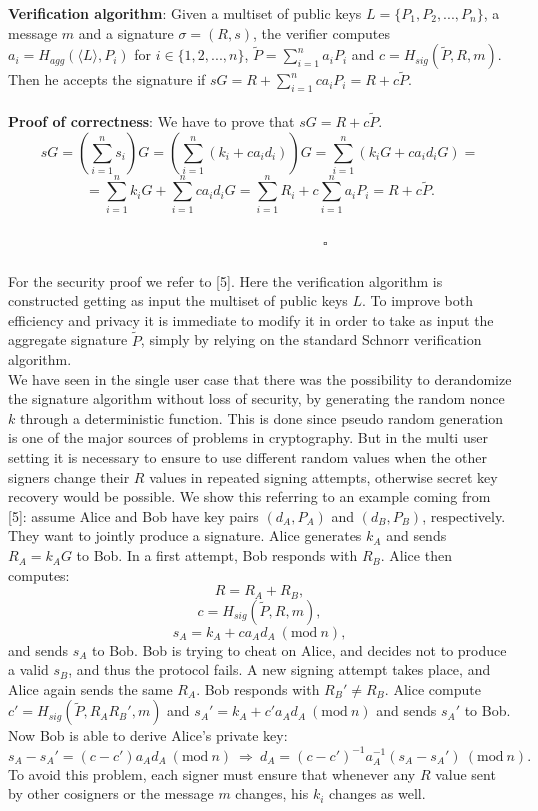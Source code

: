 \bigskip
\noindent
{\bf Verification algorithm}: Given a multiset of public keys $L = \{P_1, P_2, ..., P_n\}$, a message $m$ and a signature $\sigma = (R, s)$, the verifier computes $a_i = H_{agg}(\langle L \rangle, P_i)$ for $i \in \{1, 2, ..., n\}$, $\tilde{P} = \sum_{i = 1}^{n} a_iP_i$ and $c = H_{sig}(\tilde{P}, R, m)$. Then he accepts the signature if $sG = R + \sum_{i = 1}^{n}ca_iP_i = R + c\tilde{P}$. 
\\
\\
{\bf Proof of correctness}: We have to prove that $sG = R + c\tilde{P}$.
\\
$$sG = \left(\sum_{i = 1}^{n} s_i\right)G = \left(\sum_{i = 1}^{n}(k_i + ca_id_i)\right)G = \sum_{i = 1}^{n}(k_iG + ca_id_iG) =$$
$$= \sum_{i = 1}^{n}k_iG + \sum_{i = 1}^{n} ca_id_iG = \sum_{i = 1}^{n}R_i + c\sum_{i  = 1}^{n}a_iP_i = R + c\tilde{P}.$$
\ \ \ \ \ \ \ \ \ \ \ \ \ \ \ \ \ \ \ \ \ \ \ \ \ \ \ \ \ \ \ \ \ \ \ \ \ \ \ \ \ \ \ \ \ \ \ \ \ \ \ \ \ \ \ \ \ \ \ \ \ \ \ \ \ \ \ \ \ \ \ \ \ \ \ \ \ \ \ \ \ \ \ \ \ \ \ \ \ \ \ \ \ \ \ \ \ \ \ \ \ \ \ \ \ \ \ \ \ \ \ \ \ \ \ \ \ $\square$
\\
\\
For the security proof we refer to [5]. Here the verification algorithm is constructed getting as input the multiset of public keys $L$. To improve both efficiency and privacy it is immediate to modify it in order to take as input the aggregate signature $\tilde{P}$, simply by relying on the standard Schnorr verification algorithm.
\\
We have seen in the single user case that there was the possibility to derandomize the signature algorithm without loss of security, by generating the random nonce $k$ through a deterministic function. This is done since pseudo random generation is one of the major sources of problems in cryptography. But in the multi user setting it is necessary to ensure to use different random values when the other signers change their $R$ values in repeated signing attempts, otherwise secret key recovery would be possible. We show this referring to an example coming from [5]: assume Alice and Bob have key pairs $(d_A, P_A)$ and $(d_B, P_B)$, respectively. They want to jointly produce a signature. Alice generates $k_A$ and sends $R_A = k_AG$ to Bob. In a first attempt, Bob responds with $R_B$. Alice then computes:
$$R = R_A + R_B,$$
$$c = H_{sig}(\tilde{P}, R, m),$$
$$s_A = k_A + ca_Ad_A \ (\text{mod} \ n),$$
and sends $s_A$ to Bob. Bob is trying to cheat on Alice, and decides not to produce a valid $s_B$, and thus the protocol fails. A new signing attempt takes place, and Alice again sends the same $R_A$. Bob responds with $R_B' \neq R_B$. Alice compute $c' = H_{sig}(\tilde{P}, R_AR_B', m)$ and $s_A' = k_A + c'a_Ad_A \ (\text{mod} \ n)$ and sends $s_A'$ to Bob. Now Bob is able to derive Alice's private key:
$$s_A - s_A' = (c - c')a_Ad_A \ (\text{mod} \ n) \ \Longrightarrow \ d_A = (c - c')^{-1}a_A^{-1}(s_A - s_A') \ (\text{mod} \ n).$$
To avoid this problem, each signer must ensure that whenever any $R$ value sent by other cosigners or the message $m$ changes, his $k_i$ changes as well. 

